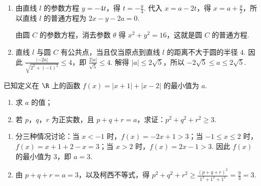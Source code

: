 \begin{solution}
\begin{enumerate}
\item 由直线 \(l\) 的参数方程 \(y=-4t\)，得 \(t=-\frac{y}{4}\). 代入 \(x=a-2t\)，得 \(x=a+\frac{y}{2}\)，所以直线 \(l\) 的普通方程为 \(2x-y-2a=0\).

由圆 \(C\) 的参数方程，消去参数 \(\theta\) 得 \(x^2+y^2=16\)，这就是圆 \(C\) 的普通方程.

\item 直线 \(l\) 与圆 \(C\) 有公共点，当且仅当原点到直线 \(l\) 的距离不大于圆的半径 \(4\). 因此
\(\frac{\left|-2a\right|}{\sqrt{2^2+(-1)^2}}\leqslant4\)，即 \(\frac{2|a|}{\sqrt5}\leqslant4\). 解得 \(|a|\leqslant2\sqrt5\)，所以 \(-2\sqrt5\leqslant a\leqslant2\sqrt5\).
\end{enumerate}
\end{solution}

\begin{problem}
已知定义在 \(\R\) 上的函数 \(f(x) = |x + 1| + |x - 2|\) 的最小值为 \(a\).

\begin{enumerate}
\item 求 \(a\) 的值；
\item 若 \(p\)，\(q\)，\(r\) 为正实数，且 \(p + q + r = a\)，求证：\(p^2 + q^2 + r^2 \geqslant 3\).
\end{enumerate}
\end{problem}

\begin{solution}
\begin{enumerate}
\item 分三种情况讨论：当 \(x<-1\) 时，\(f(x)=-2x+1>3\)；当 \(-1\leqslant x\leqslant2\) 时，\(f(x)=x+1+2-x=3\)；当 \(x>2\) 时，\(f(x)=2x-1>3\). 因此 \(f(x)\) 的最小值为 \(3\)，即 \(a=3\).

\item 由 \(p+q+r=a=3\)，以及柯西不等式，得
\(p^2+q^2+r^2\geqslant\frac{(p+q+r)^2}{1^2+1^2+1^2}=\frac{9}{3}=3\).
\end{enumerate}
\end{solution}
